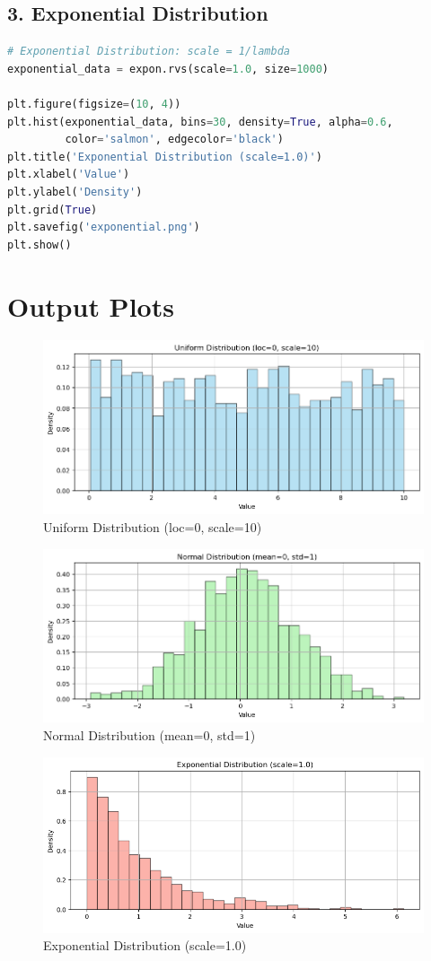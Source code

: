 \documentclass[12pt]{article}
\begin{document}
\subsection*{3. Exponential Distribution}
\begin{lstlisting}[language=Python]
# Exponential Distribution: scale = 1/lambda
exponential_data = expon.rvs(scale=1.0, size=1000)

plt.figure(figsize=(10, 4))
plt.hist(exponential_data, bins=30, density=True, alpha=0.6, 
         color='salmon', edgecolor='black')
plt.title('Exponential Distribution (scale=1.0)')
plt.xlabel('Value')
plt.ylabel('Density')
plt.grid(True)
plt.savefig('exponential.png')
plt.show()
\end{lstlisting}

\section*{Output Plots}

\begin{figure}[h!]
    \centering
    \includegraphics[width=0.8\linewidth]{unifrom distribution.png}
    \caption{Uniform Distribution (loc=0, scale=10)}
\end{figure}

\begin{figure}[h!]
    \centering
    \includegraphics[width=0.8\linewidth]{Normal distribution.png}
    \caption{Normal Distribution (mean=0, std=1)}
\end{figure}

\begin{figure}[h!]
    \centering
    \includegraphics[width=0.8\linewidth]{exponential distribution.png}
    \caption{Exponential Distribution (scale=1.0)}
\end{figure}
\end{document}
